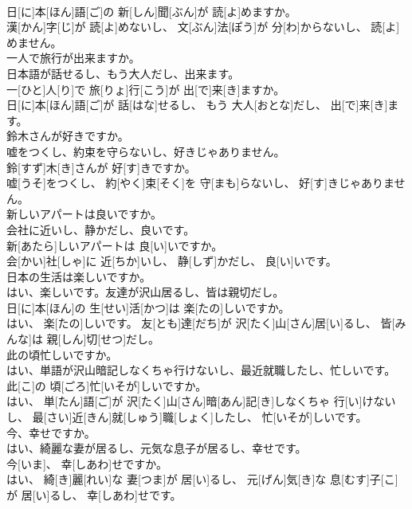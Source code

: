 \documentclass[8pt]{extreport}
\begin{document}
\begin{CJK}{UTF8}{min}
\\	日[に]本[ほん]語[ご]の 新[しん]聞[ぶん]が 読[よ]めますか。 
\\	漢[かん]字[じ]が 読[よ]めないし、 文[ぶん]法[ぽう]が 分[わ]からないし、 読[よ]めません。
\\	一人で旅行が出来ますか。 
\\	日本語が話せるし、もう大人だし、出来ます。	
\\	一[ひと]人[り]で 旅[りょ]行[こう]が 出[で]来[き]ますか。 
\\	日[に]本[ほん]語[ご]が 話[はな]せるし、 もう 大人[おとな]だし、 出[で]来[き]ます。
\\	鈴木さんが好きですか。 
\\	嘘をつくし、約束を守らないし、好きじゃありません。	
\\	鈴[すず]木[き]さんが 好[す]きですか。 
\\	嘘[うそ]をつくし、 約[やく]束[そく]を 守[まも]らないし、 好[す]きじゃありません。
\\	新しいアパートは良いですか。 
\\	会社に近いし、静かだし、良いです。	
\\	新[あたら]しいアパートは 良[い]いですか。 
\\	会[かい]社[しゃ]に 近[ちか]いし、 静[しず]かだし、 良[い]いです。
\\	日本の生活は楽しいですか。 
\\	はい、楽しいです。友達が沢山居るし、皆は親切だし。	
\\	日[に]本[ほん]の 生[せい]活[かつ]は 楽[たの]しいですか。 
\\	はい、 楽[たの]しいです。 友[とも]達[だち]が 沢[たく]山[さん]居[い]るし、 皆[みんな]は 親[しん]切[せつ]だし。
\\	此の頃忙しいですか。 
\\	はい、単語が沢山暗記しなくちゃ行けないし、最近就職したし、忙しいです。	
\\	此[こ]の 頃[ごろ]忙[いそが]しいですか。 
\\	はい、 単[たん]語[ご]が 沢[たく]山[さん]暗[あん]記[き]しなくちゃ 行[い]けないし、 最[さい]近[きん]就[しゅう]職[しょく]したし、 忙[いそが]しいです。
\\	今、幸せですか。 
\\	はい、綺麗な妻が居るし、元気な息子が居るし、幸せです。	
\\	今[いま]、 幸[しあわ]せですか。 
\\	はい、 綺[き]麗[れい]な 妻[つま]が 居[い]るし、 元[げん]気[き]な 息[むす]子[こ]が 居[い]るし、 幸[しあわ]せです。

\end{CJK}
\end{document}
